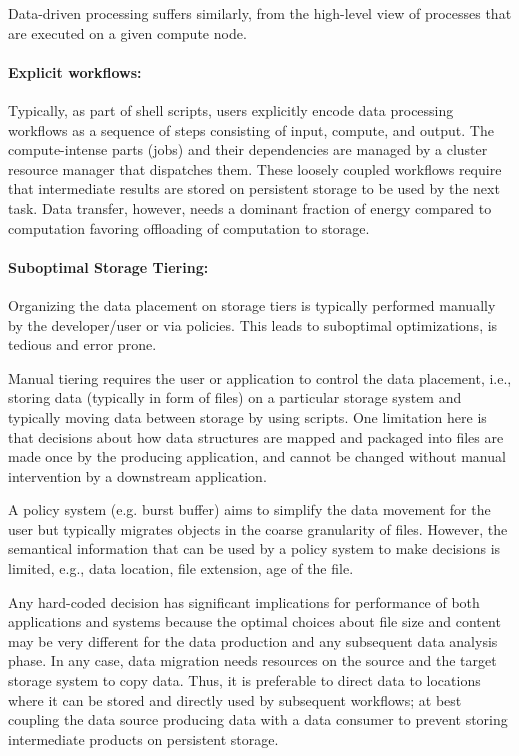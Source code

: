 \documentclass[a4paper, twocolumn]{article}
\begin{document}
Data-driven processing suffers similarly, from the high-level view of processes that are executed on a given compute node.


\paragraph{Explicit workflows:}
Typically, as part of shell scripts, users explicitly encode data processing workflows as a sequence of steps consisting of input, compute, and output.
The compute-intense parts (jobs) and their dependencies are managed by a cluster resource manager that dispatches them.
These loosely coupled workflows require that intermediate results are stored on persistent storage to be used by the next task.
Data transfer, however, needs a dominant fraction of energy compared to computation favoring offloading of computation to storage.


\paragraph{Suboptimal Storage Tiering:}
Organizing the data placement on storage tiers is typically performed manually by the developer/user or via policies.
This leads to suboptimal optimizations, is tedious and error prone.

Manual tiering requires the user or application to control the data placement, i.e., storing data (typically in form of files) on a particular storage system and typically moving data between storage by using scripts.
One limitation here is that decisions about how data structures are mapped and packaged into files are made once by the producing application, and cannot be changed without manual intervention by a downstream application.

A policy system (e.g. burst buffer) aims to simplify the data movement for the user but  typically migrates objects in the coarse granularity of files.
However, the semantical information that can be used by a policy system to make decisions is limited, e.g.,  data location, file extension, age of the file.

Any hard-coded decision has significant implications for performance of both applications and systems because the optimal choices about file size and content may be very different for the data production and any subsequent data analysis phase.
In any case, data migration needs resources on the source and the target storage system to copy data.
Thus, it is preferable to direct data to locations where it can be stored and directly used by subsequent workflows; at best coupling the data source producing data with a data consumer to prevent storing intermediate products on persistent storage.
\end{document}
